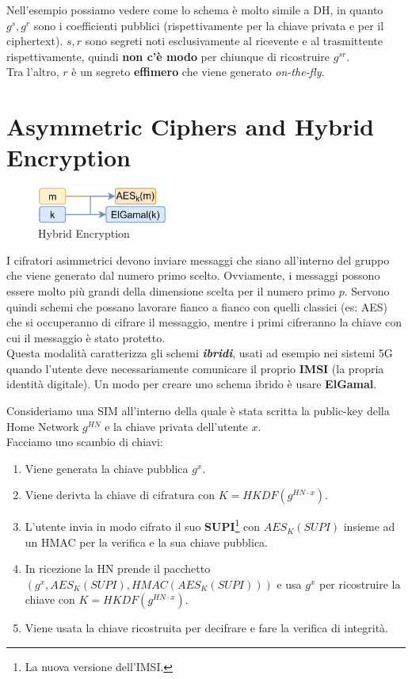 \begin{remark}
Nell'esempio possiamo vedere come lo schema è molto simile a DH, in quanto $g^s,g^r$ sono i coefficienti pubblici (rispettivamente per la chiave privata e per il ciphertext). $s,r$ sono segreti noti esclusivamente al ricevente e al trasmittente rispettivamente, quindi \textbf{non c'è modo} per chiunque di ricostruire $g^{sr}$.\\
Tra l'altro, $r$ è un segreto \textbf{effimero} che viene generato \textit{on-the-fly}.
\end{remark}
\section{Asymmetric Ciphers and Hybrid Encryption}
\begin{figure}
\centering
    \includegraphics[width=0.38\textwidth]{image/threshold/hybrid.png}
\caption{Hybrid Encryption}
\label{fig:hybrid}
\end{figure}
I cifratori asimmetrici devono inviare messaggi che siano all'interno del gruppo che viene generato dal numero primo scelto. Ovviamente, i messaggi possono essere molto più grandi della dimensione scelta per il numero primo $p$. Servono quindi schemi che possano lavorare fianco a fianco con quelli classici (es: AES) che si occuperanno di cifrare il messaggio, mentre i primi cifreranno la chiave con cui il messaggio è stato protetto.\\
Questa modalità caratterizza gli schemi \textbf{\textit{ibridi}}, usati ad esempio nei sistemi 5G quando l'utente deve necessariamente comunicare il proprio \textbf{IMSI} (la propria identità digitale). Un modo per creare uno schema ibrido è usare \textbf{ElGamal}.

\begin{example}
Consideriamo una SIM all'interno della quale è stata scritta la public-key della Home Network $g^{HN}$ e la chiave privata dell'utente $x$.\\
Facciamo uno scambio di chiavi:
\begin{enumerate}
    \item Viene generata la chiave pubblica $g^x$.
    \item Viene derivta la chiave di cifratura con $K=HKDF(g^{HN\cdot x})$.
    \item L'utente invia in modo cifrato il suo \textbf{SUPI}\footnote{La nuova versione dell'IMSI.} con $AES_K(SUPI)$ insieme ad un HMAC per la verifica e la sua chiave pubblica.
    \item In ricezione la HN prende il pacchetto $(g^x,AES_K(SUPI),HMAC(AES_K(SUPI)))$ e usa $g^x$ per ricostruire la chiave con $K=HKDF(g^{HN\cdot x})$.
    \item Viene usata la chiave ricostruita per decifrare e fare la verifica di integrità.
\end{enumerate}
\end{example}

